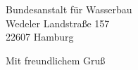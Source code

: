 \documentclass[ebner,paper=a4,fontsize=11pt,ngerman,BCOR=10mm]{scrlttr2}%
\begin{document}
\begin{letter}{Bundesanstalt f\"ur Wasserbau\\
Wedeler Landstra{\ss}e 157\\ 
22607 Hamburg}
% 
% 
% 
% 
% 
% 
% 

\closing{Mit freundlichem Gru\ss}
\enlargethispage{6\baselineskip}

\end{letter}
\end{document}
